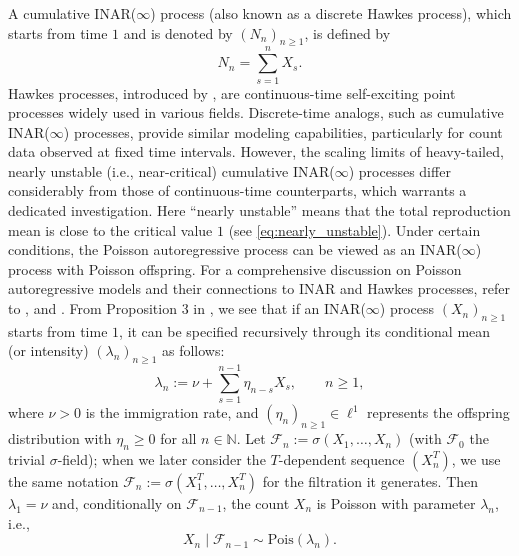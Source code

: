 \documentclass[letterpaper]{article}
\numberwithin{equation}{section}
\theoremstyle{definition}
\theoremstyle{remark}
\begin{document}
A cumulative INAR($\infty$) process (also known as a discrete Hawkes process), which starts from time $1$ and is denoted by $(N_n)_{n\ge1}$, is defined by
\begin{equation}
  N_n = \sum_{s=1}^n X_s.
\end{equation}
Hawkes processes, introduced by \cite{hawkes1971spectra}, are continuous-time self-exciting point processes widely used in various fields. Discrete-time analogs, such as cumulative INAR($\infty$) processes, provide similar modeling capabilities, particularly for count data observed at fixed time intervals. However, the scaling limits of heavy-tailed, {nearly unstable (i.e., near-critical)} cumulative INAR($\infty$) processes differ considerably from those of continuous-time counterparts, which warrants a dedicated investigation. {Here ``nearly unstable'' means that the total reproduction mean is close to the critical value $1$ (see \eqref{eq:nearly_unstable}).}
Under certain conditions, the Poisson autoregressive process can be viewed as an INAR($\infty$) process with Poisson offspring.
For a comprehensive discussion on Poisson autoregressive models and their connections to INAR and Hawkes processes, refer to \cite{fokianos2021multivariate}, \cite{huang2023nonlinear} and \cite{kirchner2016hawkes}. 
From Proposition 3 in \cite{kirchner2016hawkes}, we see that if an INAR($\infty$) process $(X_n)_{n \geq 1}$ starts from time $1$, {it can be specified recursively through its conditional mean (or intensity) $(\lambda_n)_{n\ge 1}$ as follows:}
  \begin{equation}\label{process_definition}
  \lambda_n := \nu + \sum_{s=1}^{n-1} \eta_{n-s} X_s, \qquad n\ge 1,
  \end{equation}
  where $\nu > 0$ is the immigration rate, and $(\eta_n)_{n \geq 1} \in \ell^1$ represents the offspring distribution with $\eta_n \geq 0$ for all $n \in \mathbb{N}$. {Let $\mathcal{F}_{n}:=\sigma(X_1,\dots,X_n)$ (with $\mathcal{F}_0$ the trivial $\sigma$-field); when we later consider the $T$-dependent sequence $(X_n^T)$, we use the same notation $\mathcal{F}_n:=\sigma(X_1^T,\dots,X_n^T)$ for the filtration it generates.} Then $\lambda_1=\nu$ and, conditionally on $\mathcal{F}_{n-1}$, the count $X_n$ is Poisson with parameter $\lambda_n$, i.e.,
  \[
  X_n \mid \mathcal{F}_{n-1} \sim \text{Pois}(\lambda_n).
  \]
\end{document}

